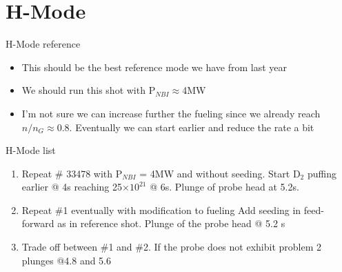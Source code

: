 \documentclass[10pt, compress]{beamer}
\newcommand\Fontvi{\fontsize{8}{7.2}\selectfont}
\begin{document}
  \section{H-Mode}
  \begin{frame}{H-Mode reference}
\vspace{-1cm}
    \Fontvi
  \begin{itemize}
    \item This should be the best reference mode we have from last year
    \item We should run this shot with P$_{NBI}\approx $4MW
    \item I'm not sure we can increase further the fueling since we
      already reach $n/n_G\approx 0.8$. Eventually we can start
      earlier and reduce the rate a bit
  \end{itemize}    
  \end{frame}
  \begin{frame}{H-Mode list}
    \begin{enumerate}
      \item Repeat \# 33478 with P$_{NBI}$ = 4MW and without seeding. Start D$_2$
        puffing earlier @ 4s reaching 25$\times 10^{21}$ @
        6s. Plunge of probe head at 5.2s.
        \item Repeat \#1 eventually with modification to fueling
          Add seeding in feed-forward as in reference shot. Plunge of
          the probe head @ 5.2 s
        \item Trade off between \#1 and \#2. If the probe does not
          exhibit problem 2 plunges @4.8 and 5.6
    \end{enumerate}
  \end{frame}
\end{document}
